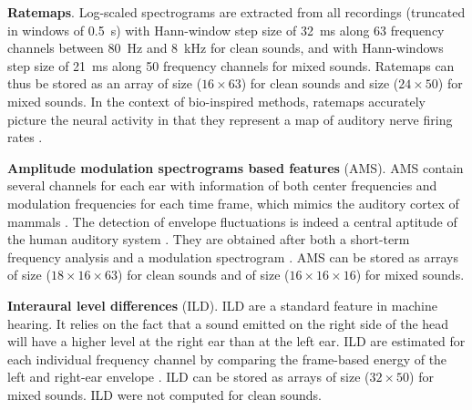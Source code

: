 \textbf{Ratemaps}. Log-scaled spectrograms are extracted from all recordings (truncated in windows of 0.5~s) with Hann-window step size of 32~ms along 63 frequency channels between 80~Hz and 8~kHz for clean sounds, and with Hann-windows step size of 21~ms along 50 frequency channels for mixed sounds. Ratemaps can thus be stored as an array of size ($16 \times 63$) for clean sounds and size ($24 \times 50$) for mixed sounds. In the context of bio-inspired methods, ratemaps accurately picture the neural activity in that they represent a map of auditory nerve firing rates \parencite{schymuratwo}.

\textbf{Amplitude modulation spectrograms based features} (AMS). AMS contain several channels for each ear with information of both center frequencies and modulation frequencies for each time frame, which mimics the auditory cortex of mammals \parencite{langner1992periodicity}. The detection of envelope fluctuations is indeed a central aptitude of the human auditory system \parencite{moritz2011amplitude}. They are obtained after both a short-term frequency analysis and a modulation spectrogram \parencite{schymuratwo}. AMS can be stored as arrays of size ($18 \times 16 \times 63$) for clean sounds and of size ($16 \times 16 \times 16$) for mixed sounds.

\textbf{Interaural level differences} (ILD). ILD are a standard feature in machine hearing. It relies on the fact that a sound emitted on the right side of the head will have a higher level at the right ear than at the left ear. ILD are estimated for each individual frequency channel by comparing the frame-based energy of the left and right-ear envelope \parencite{schymuratwo}. ILD can be stored as arrays of size ($32 \times 50$) for mixed sounds. ILD were not computed for clean sounds.

